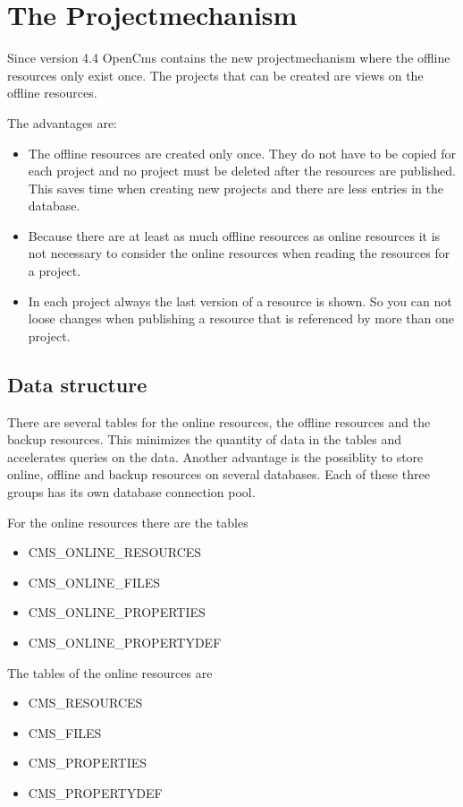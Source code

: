 \section{The Projectmechanism}

Since version 4.4 OpenCms contains the new projectmechanism where the offline
resources only exist once. The projects that can be created are
views on the offline resources.

The advantages are:
\begin{itemize}
\item The offline resources are created only once. They do not have to be copied for each project and no project must be deleted after the resources are published. This saves time when creating new projects and there are less entries in the database.
\item Because there are at least as much offline resources as online resources it is not necessary to consider the online resources when reading the resources for a project.
\item In each project always the last version of a resource is shown. So you can not loose changes when publishing a resource that is referenced by more than one project.
\end{itemize}

\subsection{Data structure}
 
 

There are several tables for the online resources, the offline
resources and the backup resources. This minimizes the quantity of
data in the tables and accelerates queries on the data. Another
advantage is the possiblity to store online, offline and backup
resources on several databases. Each of these three groups has its
own database connection pool.

For the online resources there are the tables
\begin{itemize}
\item CMS\_ONLINE\_RESOURCES
\item CMS\_ONLINE\_FILES
\item CMS\_ONLINE\_PROPERTIES
\item CMS\_ONLINE\_PROPERTYDEF
\end{itemize}

The tables of the online resources are
\begin{itemize}
\item CMS\_RESOURCES
\item CMS\_FILES
\item CMS\_PROPERTIES
\item CMS\_PROPERTYDEF
\end{itemize}

